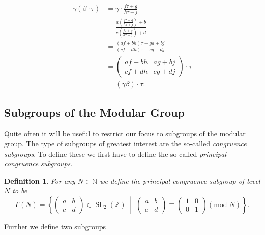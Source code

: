 \documentclass[titlepage,a4paper]{article}
\theoremstyle{theoremdd}
\theoremstyle{definitiondd}
\newtheorem{definition}[theorem]{Definition}
\theoremstyle{remarkdd}
\newcommand{\N}{\mathbb{N}}
\newcommand{\Z}{\mathbb{Z}}
\newcommand{\bigset}[2]{ \left\{ #1 \;\middle|\; #2 \right\} }
\DeclareMathOperator{\SL}{SL}
\begin{document}
\begin{align*}
	\gamma \left( \beta \cdot  \tau\right) &=  \gamma\cdot \frac{f\tau + g}{h \tau + j} \\
					       &= \frac{a\left( \frac{f \tau + g}{h\tau + j} \right) + b}{c \left( \frac{f \tau + g}{h \tau + j} \right) + d} \\	
					       &= \frac{(af + bh)\tau + ga + bj}{(cf + dh) \tau + cg + dj} \\
					       &= \begin{pmatrix} af + bh & ag + bj \\ cf + dh & cg + dj \end{pmatrix} \cdot \tau \\
					       &= (\gamma \beta)\cdot \tau 
.\end{align*}

\subsection{Subgroups of the Modular Group} \label{sec:subgroups_of_the_modular_group}
Quite often it will be useful to restrict our focus to subgroups of the modular group. 
The type of subgroups of greatest interest are the so-called \emph{congruence subgroups}.
To define these we first have to define the so called \emph{principal congruence subgroups}.  
\begin{definition}
	For any $N \in \N$ we define the \emph{principal congruence subgroup of level $N$} to be \[
		\Gamma(N) = \bigset{\begin{pmatrix} a & b \\ c & d \end{pmatrix} \in \SL_2(\Z)}{\begin{pmatrix} a & b \\ c & d \end{pmatrix}  \equiv \begin{pmatrix} 1 & 0 \\ 0 & 1 \end{pmatrix}  (\mathrm{mod}\; N)}
	.\] 
\end{definition}
Further we define two subgroups
\end{document}
